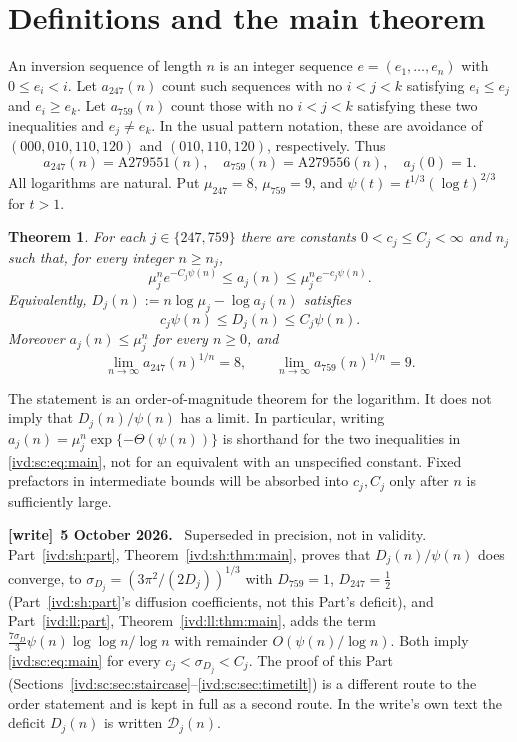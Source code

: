 \documentclass[11pt,letterpaper]{article}
\newtheorem{theorem}{Theorem}[section]
\theoremstyle{remark}\newtheorem{remark}[theorem]{Remark}
\numberwithin{equation}{section}
\newcommand{\Dfc}{\mathcal D}
\newenvironment{writenote}[1][]{\par\smallskip\begingroup\small
 \noindent\textbf{[write]}\if\relax\detokenize{#1}\relax\else~\textbf{#1.}\fi\ }%
 {\par\endgroup\smallskip}
\begin{document}
\section{Definitions and the main theorem}\label{ivd:sc:sec:main}
An inversion sequence of length $n$ is an integer sequence
$e=(e_1,\ldots,e_n)$ with $0\le e_i<i$. Let $a_{247}(n)$ count such
sequences with no $i<j<k$ satisfying $e_i\le e_j$ and $e_i\ge e_k$.
Let $a_{759}(n)$ count those with no $i<j<k$ satisfying these two
inequalities and $e_j\ne e_k$. In the usual pattern notation, these are
avoidance of $(000,010,110,120)$ and $(010,110,120)$, respectively.
Thus
\[
 a_{247}(n)=\mathrm{A279551}(n),\quad
 a_{759}(n)=\mathrm{A279556}(n),\quad a_j(0)=1.
\]
All logarithms are natural. Put $\mu_{247}=8$, $\mu_{759}=9$, and
$\psi(t)=t^{1/3}(\log t)^{2/3}$ for $t>1$.
\begin{theorem}\label{ivd:sc:thm:main}
For each $j\in\{247,759\}$ there are constants $0<c_j\le C_j<\infty$
and $n_j$ such that, for every integer $n\ge n_j$,
\begin{equation}\label{ivd:sc:eq:main}
 \mu_j^n e^{-C_j\psi(n)}\le a_j(n)\le
 \mu_j^n e^{-c_j\psi(n)}.
\end{equation}
Equivalently, $D_j(n):=n\log\mu_j-\log a_j(n)$ satisfies
\[
 c_j\psi(n)\le D_j(n)\le C_j\psi(n).
\]
Moreover $a_j(n)\le\mu_j^n$ for every $n\ge0$, and
\begin{equation}\label{ivd:sc:eq:growth}
 \lim_{n\to\infty}a_{247}(n)^{1/n}=8,\qquad
 \lim_{n\to\infty}a_{759}(n)^{1/n}=9.
\end{equation}
\end{theorem}
The statement is an order-of-magnitude theorem for the logarithm. It does
not imply that $D_j(n)/\psi(n)$ has a limit. In particular, writing
$a_j(n)=\mu_j^n\exp\{-\Theta(\psi(n))\}$ is shorthand for the two
inequalities in \eqref{ivd:sc:eq:main}, not for an equivalent with an unspecified
constant. Fixed prefactors in intermediate bounds will be absorbed into
$c_j,C_j$ only after $n$ is sufficiently large.
\begin{writenote}[5 October 2026]
Superseded in precision, not in validity. Part~\ref{ivd:sh:part}, Theorem~\ref{ivd:sh:thm:main}, proves that $D_j(n)/\psi(n)$ does converge, to $\sigma_{D_j}=(3\pi^2/(2D_j))^{1/3}$ with $D_{759}=1$, $D_{247}=\frac12$ (Part~\ref{ivd:sh:part}'s diffusion coefficients, not this Part's deficit), and Part~\ref{ivd:ll:part}, Theorem~\ref{ivd:ll:thm:main}, adds the term $\frac{7\sigma_D}{3}\psi(n)\log\log n/\log n$ with remainder $O(\psi(n)/\log n)$. Both imply \eqref{ivd:sc:eq:main} for every $c_j<\sigma_{D_j}<C_j$. The proof of this Part (Sections~\ref{ivd:sc:sec:staircase}--\ref{ivd:sc:sec:timetilt}) is a different route to the order statement and is kept in full as a second route. In the write's own text the deficit $D_j(n)$ is written $\Dfc_j(n)$.
\end{writenote}
\end{document}

